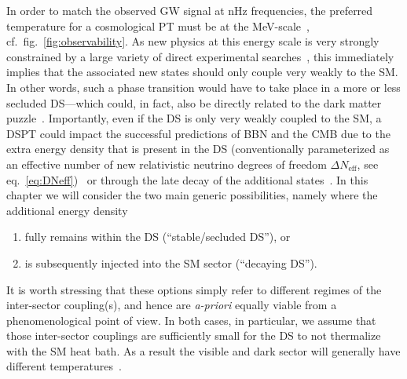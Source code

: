 In order to match the observed \ac{GW} signal at nHz frequencies, the preferred temperature for a cosmological \ac{PT} must be at the MeV-scale~\cite{NANOGrav:2021flc, NANOGrav:2023hvm}, cf.~fig.~\ref{fig:observability}. As new physics at this 
energy scale is very strongly constrained by a large variety of direct experimental searches~\cite{Gori:2022vri}, this immediately implies that the associated new states should only couple very weakly to the \ac{SM}. In other words, such a  phase transition would have to take place in a more or less secluded \ac{DS}---which could, in fact, also be directly related to the dark matter puzzle~\cite{Pospelov:2007mp,Feng:2008mu,Pospelov:2008zw}. Importantly, even if the \ac{DS} is only very weakly coupled to the \ac{SM}, a \ac{DSPT} could impact the successful predictions of \ac{BBN} and the \ac{CMB} due to the extra energy density that is present in the \ac{DS} (conventionally parameterized as an effective number of new relativistic neutrino degrees of freedom $\Delta N_\text{eff}$, see eq.~\eqref{eq:DNeff})~\cite{Planck:2018vyg,Yeh:2022heq} or through the late decay of the additional states~\cite{Hufnagel:2018bjp,Forestell:2018txr, Depta:2021kae,Depta:2020mhj,Kawasaki:2020qxm}. In this chapter we will consider the two main generic possibilities, namely where the additional energy density
\begin{enumerate}
	\item fully remains within the \ac{DS} (``stable/secluded \ac{DS}''), or 
	\item is subsequently injected into the \ac{SM} sector (``decaying \ac{DS}'').
\end{enumerate}
It is worth stressing that these options simply refer to different regimes of the inter-sector coupling(s), and hence are \textit{a-priori} equally viable from a phenomenological point of view. In both cases, in particular, we assume that those inter-sector couplings are sufficiently small for the \ac{DS} to not thermalize with the \ac{SM} heat bath. As a result the visible and dark sector will generally have different temperatures~\cite{Breitbach:2018ddu}. 

